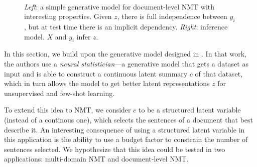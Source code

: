 
\begin{figure}[t]
    \centering
    ~

    \caption{{\it Left}: a simple generative model for document-level
        NMT with interesting properties. Given $z$, there is full
        independence between $y_i$, but at test time there is an implicit
        dependency.
            {\it Right}: inference model. $X$ and $y_i$ infer $z$.}
    \label{fig:doclevel}
\end{figure}

In this section, we build upon the generative model designed in
\citet{edwards2017prociclr}. In that work, the authors use a {\it
        neural statistician}---a generative model that gets a dataset as
input and is able to construct a continuous latent summary $c$ of
that dataset, which in turn allows the model to get better latent
representations $z$ for unsupervised and few-shot learning.

To extend this idea to NMT, we consider $c$ to be a structured latent
variable (instead of a continous one), which selects the sentences of
a document that best describe it. An interesting consequence of using
a structured latent variable in this application is the ability to
use a budget factor to constrain the number of sentences selected. We
hypothesize that this idea could be tested in two applications:
multi-domain NMT and document-level NMT.

